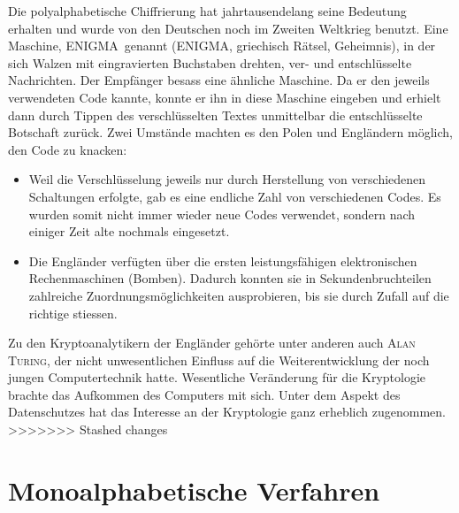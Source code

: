 \documentclass[%
<<<<<<< Updated upstream
11pt,%
twoside,%
titlepage,%
german,%
headsepline%
]{scrartcl}
\begin{document}
Die polyalphabetische Chiffrierung hat jahrtausendelang seine Bedeutung erhalten und wurde von den Deutschen noch im Zweiten Weltkrieg benutzt. Eine Maschine, \glqq ENIGMA\grqq\ genannt (ENIGMA, griechisch Rätsel, Geheimnis), in der sich Walzen mit eingravierten Buchstaben drehten, ver- und entschlüsselte Nachrichten. Der Empfänger besass eine ähnliche Maschine. Da er den jeweils verwendeten Code kannte, konnte er ihn in diese Maschine eingeben und erhielt dann durch Tippen des verschlüsselten Textes unmittelbar die entschlüsselte Botschaft zurück. Zwei Umstände machten es den Polen und Engländern möglich, den Code zu knacken:
\begin{itemize}
\item Weil die Verschlüsselung jeweils nur durch Herstellung von verschiedenen Schaltungen erfolgte, gab es eine endliche Zahl von verschiedenen Codes. Es wurden somit nicht immer wieder neue Codes verwendet, sondern nach einiger Zeit alte nochmals eingesetzt. 
\item Die Engländer verfügten über die ersten leistungsfähigen elektronischen	Rechenmaschinen (Bomben). Dadurch konnten sie in Sekundenbruchteilen zahlreiche Zu\-ord\-nungs\-mög\-lich\-kei\-ten ausprobieren, bis sie durch Zufall auf die richtige stiessen.
\end{itemize}

 Zu den Kryptoanalytikern der Engländer gehörte unter anderen auch \textsc{Alan Turing}, der nicht unwesentlichen Einfluss auf die Weiterentwicklung der noch jungen Computertechnik hatte. Wesentliche Veränderung für die Kryptologie brachte das Aufkommen des Computers mit sich. Unter dem Aspekt des Datenschutzes hat das Interesse an der Kryptologie ganz erheblich zugenommen.
>>>>>>> Stashed changes

\clearpage

\section{Monoalphabetische Verfahren}
\end{document}
